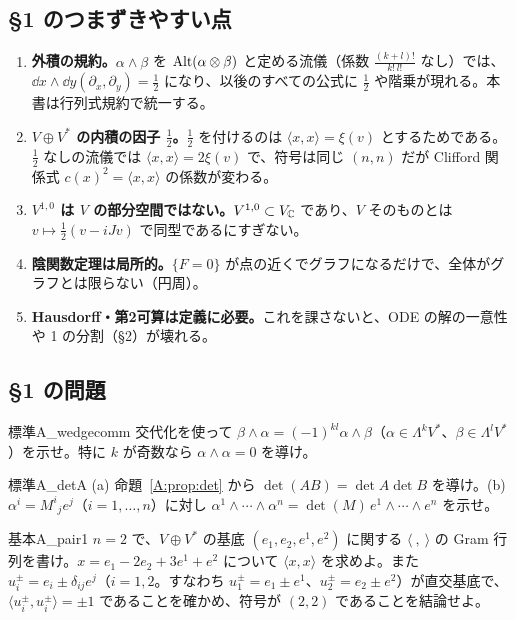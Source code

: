 \subsection*{§1 のつまずきやすい点}
\begin{enumerate}
\item \textbf{外積の規約。}$\alpha\wedge\beta$ を $\operatorname{Alt}(\alpha\otimes\beta)$ と定める流儀（係数 $\frac{(k+l)!}{k!\,l!}$ なし）では、$\dd x\wedge\dd y(\partial_x,\partial_y)=\frac12$ になり、以後のすべての公式に $\frac12$ や階乗が現れる。本書は行列式規約で統一する。
\item \textbf{$V\oplus V^*$ の内積の因子 $\frac12$。}$\frac12$ を付けるのは $\langle x,x\rangle=\xi(v)$ とするためである。$\frac12$ なしの流儀では $\langle x,x\rangle=2\xi(v)$ で、符号は同じ $(n,n)$ だが Clifford 関係式 $c(x)^2=\langle x,x\rangle$ の係数が変わる。
\item \textbf{$V^{1,0}$ は $V$ の部分空間ではない。}$V^{1,0}\subset V_{\mathbb C}$ であり、$V$ そのものとは $v\mapsto\frac12(v-iJv)$ で同型であるにすぎない。
\item \textbf{陰関数定理は局所的。}$\{F=0\}$ が点の近くでグラフになるだけで、全体がグラフとは限らない（円周）。
\item \textbf{Hausdorff・第2可算は定義に必要。}これを課さないと、ODE の解の一意性や 1 の分割（§2）が壊れる。
\end{enumerate}

\subsection*{§1 の問題}

\begin{probl}{標準}{A_wedgecomm}
交代化を使って $\beta\wedge\alpha=(-1)^{kl}\alpha\wedge\beta$（$\alpha\in\Lambda^kV^*$、$\beta\in\Lambda^lV^*$）を示せ。特に $k$ が奇数なら $\alpha\wedge\alpha=0$ を導け。
\end{probl}

\begin{probl}{標準}{A_detA}
(a) 命題~\ref{A:prop:det} から $\det(AB)=\det A\det B$ を導け。(b) $\alpha^i=M^i{}_je^j$（$i=1,\dots,n$）に対し $\alpha^1\wedge\cdots\wedge\alpha^n=\det(M)\,e^1\wedge\cdots\wedge e^n$ を示せ。
\end{probl}

\begin{probl}{基本}{A_pair1}
$n=2$ で、$V\oplus V^*$ の基底 $(e_1,e_2,e^1,e^2)$ に関する $\langle\ ,\ \rangle$ の Gram 行列を書け。$x=e_1-2e_2+3e^1+e^2$ について $\langle x,x\rangle$ を求めよ。また $u_i^\pm=e_i\pm\delta_{ij}e^j$（$i=1,2$。すなわち $u_1^\pm=e_1\pm e^1$、$u_2^\pm=e_2\pm e^2$）が直交基底で、$\langle u_i^\pm,u_i^\pm\rangle=\pm1$ であることを確かめ、符号が $(2,2)$ であることを結論せよ。
\end{probl}

